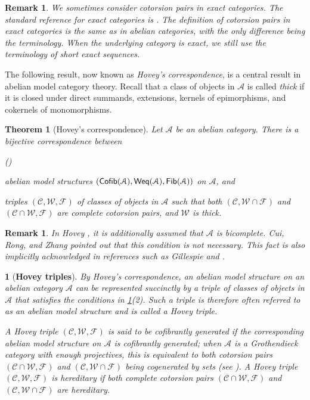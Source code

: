 \documentclass[12pt,twoside]{amsart}
\theoremstyle{bfupright head,slanted body}
\theoremstyle{bfupright head,upright body}
\newtheorem{bfhpg}[res]{}               \newtheorem*{bfhpg*}{}
\theoremstyle{fixed bf head,slanted body}
\newtheorem{thm}[res]{Theorem}          \newtheorem*{thm*}{Theorem}
\theoremstyle{fixed bf head,upright body}
\newtheorem{rmk}[res]{Remark}           \newtheorem*{rmk*}{Remark}
\theoremstyle{numbered paragraph}
\newlength{\thmlistleft}        %
\newlength{\thmlistright}       %
\newlength{\thmlistpartopsep}   %
\newlength{\thmlisttopsep}      %
\newlength{\thmlistparsep}      %
\newlength{\thmlistitemsep}     %
\newcounter{rqm}
\newenvironment{rqm}{\begin{list}{\upshape (\arabic{rqm})}%
    {\usecounter{rqm}%
      \setlength{\leftmargin}{\thmlistleft}%
      \setlength{\labelwidth}{\thmlistleft}%
      \setlength{\rightmargin}{\thmlistright}%
      \setlength{\partopsep}{\thmlistpartopsep}%
      \setlength{\topsep}{\thmlisttopsep}%
      \setlength{\parsep}{\thmlistparsep}%
      \setlength{\itemsep}{\thmlistitemsep}}}%
  {\end{list}}%
\newcommand{\thmcite}[2][?]{\cite[Theorem~#1]{#2}}
\numberwithin{equation}{res}
\newcommand{\calC}{\mathcal{C}}
\newcommand{\calW}{\mathcal{W}}
\newcommand{\calF}{\mathcal{F}}
\newcommand{\calA}{\mathcal{A}}
\newcommand{\Cofib}{\sf{Cofib}}
\newcommand{\Fib}{\sf{Fib}}
\newcommand{\Weq}{\sf{Weq}}
\begin{document}
\begin{rmk}\label{exact terminology}
We sometimes consider cotorsion pairs in exact categories. The standard reference for exact categories is \cite{2010ExaCat}. The definition of cotorsion pairs in exact categories is the same as in abelian categories, with the only difference being the terminology. When the underlying category is exact, we still use the terminology of short exact sequences.
\end{rmk}

The following result, now known as \emph{Hovey's correspondence}, is a central result in abelian model category theory. Recall that a class of objects in \(\mathcal{A}\) is called \emph{thick} if it is closed under direct summands, extensions, kernels of epimorphisms, and cokernels of monomorphisms.

\begin{thm}[Hovey's correspondence]\label{Hovey cor}
Let \(\calA\) be an abelian category. There is a bijective correspondence between
\begin{rqm}
\item abelian model structures \((\Cofib(\calA),\Weq(\calA),\Fib(\calA))\) on \(\calA\), and
\item triples \((\calC,\calW,\calF)\) of classes of objects in \(\calA\) such that both \((\calC,\calW\cap\calF)\) and \((\calC\cap\calW,\calF)\) are complete cotorsion pairs, and \(\calW\) is thick.
\end{rqm}
\end{thm}

\begin{rmk}\label{rmk for Hovey cor}
In Hovey \thmcite[2.2]{HOVEY2002}, it is additionally assumed that \(\calA\) is bicomplete. Cui, Rong, and Zhang \cite{2025ZhangPu} pointed out that this condition is not necessary. This fact is also implicitly acknowledged in references such as Gillespie \cite{Gill2011} and \cite{HOWTO}.
\end{rmk}

\begin{bfhpg}[\bf Hovey triples]
By Hovey's correspondence, an abelian model structure on an abelian category \(\calA\) can be represented succinctly by a triple of classes of objects in \(\calA\) that satisfies the conditions in \ref{Hovey cor}(2). Such a triple is therefore often referred to as an abelian model structure and is called a \emph{Hovey triple}.

A Hovey triple \((\calC,\calW,\calF)\) is said to be \emph{cofibrantly generated} if the corresponding abelian model structure on \(\calA\) is cofibrantly generated; when \(\calA\) is a Grothendieck category with enough projectives, this is equivalent to both cotorsion pairs \((\calC\cap\calW,\calF)\) and \((\calC,\calW\cap\calF)\) being cogenerated by sets (see \cite[Proposition 1.2.7 and Corollary 1.2.2]{Be14}). A Hovey triple \((\calC,\calW,\calF)\) is \emph{hereditary} if both complete cotorsion pairs \((\calC\cap\calW,\calF)\) and \((\calC,\calW\cap\calF)\) are hereditary.
\end{bfhpg}
\end{document}
